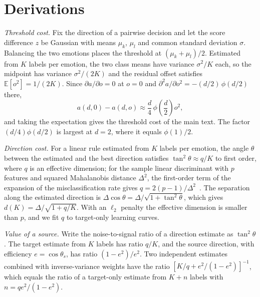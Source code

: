 \documentclass[10pt,journal,compsoc]{IEEEtran}
\begin{document}
\section{Derivations}
\label{sec:supp-derivations}

\emph{Threshold cost.}
Fix the direction of a pairwise decision and let the score difference $z$ be Gaussian with means $\mu_k$, $\mu_l$ and common standard deviation $\sigma$.
Balancing the two emotions places the threshold at $(\mu_k + \mu_l)/2$.
Estimated from $K$ labels per emotion, the two class means have variance $\sigma^2/K$ each, so the midpoint has variance $\sigma^2/(2K)$ and the residual offset satisfies $\mathbb{E}[o^2] = 1/(2K)$.
Since $\partial a/\partial o = 0$ at $o=0$ and $\partial^2 a/\partial o^2 = -(d/2)\,\phi(d/2)$ there,
\begin{equation}
a(d, 0) - a(d, o) \approx \frac{d}{4}\,\phi\!\left(\frac{d}{2}\right) o^2,
\end{equation}
and taking the expectation gives the threshold cost of the main text. The factor $(d/4)\phi(d/2)$ is largest at $d=2$, where it equals $\phi(1)/2$.

\emph{Direction cost.}
For a linear rule estimated from $K$ labels per emotion, the angle $\theta$ between the estimated and the best direction satisfies $\tan^2\theta \approx q/K$ to first order, where $q$ is an effective dimension; for the sample linear discriminant with $p$ features and squared Mahalanobis distance $\Delta^2$, the first-order term of the expansion of the misclassification rate gives $q = 2(p-1)/\Delta^2$~\cite{okamoto1963asymptotic,raudys1998intrinsic}.
The separation along the estimated direction is $\Delta\cos\theta = \Delta/\sqrt{1 + \tan^2\theta}$, which gives $d(K) = \Delta/\sqrt{1 + q/K}$.
With an $\ell_2$ penalty the effective dimension is smaller than $p$, and we fit $q$ to target-only learning curves.

\emph{Value of a source.}
Write the noise-to-signal ratio of a direction estimate as $\tan^2\theta$.
The target estimate from $K$ labels has ratio $q/K$, and the source direction, with efficiency $e = \cos\theta_s$, has ratio $(1-e^2)/e^2$.
Two independent estimates combined with inverse-variance weights have the ratio $\left[K/q + e^2/(1-e^2)\right]^{-1}$, which equals the ratio of a target-only estimate from $K + n$ labels with $n = q e^2/(1-e^2)$.
\end{document}
